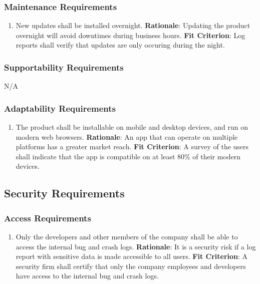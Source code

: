 \documentclass[12pt]{article}
\begin{document}
\subsubsection{Maintenance Requirements}
\begin{enumerate}[nfr]
    \item New updates shall be installed overnight.
    \newline \textbf{Rationale}: Updating the product overnight will avoid downtimes during business hours.
    \newline \textbf{Fit Criterion}: Log reports shall verify that updates are only occuring during the night.
\end{enumerate}

\subsubsection{Supportability Requirements}
N/A

\subsubsection{Adaptability Requirements}
\begin{enumerate}[nfr]
    \item The product shall be installable on mobile and desktop devices, and run on modern web browsers.
    \newline \textbf{Rationale}: An app that can operate on multiple platforms has a greater market reach.
    \newline \textbf{Fit Criterion}: A survey of the users shall indicate that the app is compatible on at least 80\% of their modern devices.
\end{enumerate}

\subsection{Security Requirements}
\subsubsection{Access Requirements}
\begin{enumerate}[nfr]
    \item Only the developers and other members of the company shall be able to access the internal bug and crash logs.
    \newline \textbf{Rationale}: It is a security risk if a log report with sensitive data is made accessible to all users.
    \newline \textbf{Fit Criterion}: A security firm shall certify that only the company employees and developers have access to the internal bug and crash logs.
\end{enumerate}
\end{document}
